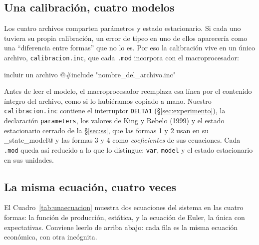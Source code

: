 \documentclass[11pt,a4paper]{report}
\newcommand{\code}[1]{\texttt{#1}}
\begin{document}
\subsection{Una calibración, cuatro modelos}

Los cuatro archivos comparten parámetros y estado estacionario. Si cada uno tuviera
su propia calibración, un error de tipeo en uno de ellos aparecería como una
``diferencia entre formas'' que no lo es. Por eso la calibración vive en un único
archivo, \code{calibracion.inc}, que cada \code{.mod} incorpora con el
macroprocesador:

\begin{sintaxis}{incluir un archivo}
@#include "nombre_del_archivo.inc"
\end{sintaxis}

\noindent Antes de leer el modelo, el macroprocesador reemplaza esa línea por el
contenido íntegro del archivo, como si lo hubiéramos copiado a mano. Nuestro
\code{calibracion.inc} contiene el interruptor \code{DELTA1}
(\S\ref{sec:experimento}), la declaración \code{parameters}, los valores de King y
Rebelo (1999) y el estado estacionario cerrado de la \S\ref{sec:ss}, que las formas
1 y 2 usan en su \lstinline@steady_state_model@ y las formas 3 y 4 como
\emph{coeficientes} de sus ecuaciones. Cada \code{.mod} queda así reducido a lo que
lo distingue: \code{var}, \code{model} y el estado estacionario en sus unidades.

\subsection{La misma ecuación, cuatro veces}

El Cuadro~\ref{tab:unaecuacion} muestra dos ecuaciones del sistema en las cuatro
formas: la función de producción, estática, y la ecuación de Euler, la única con
expectativas. Conviene leerlo de arriba abajo: cada fila es la misma ecuación
económica, con otra incógnita.
\end{document}
